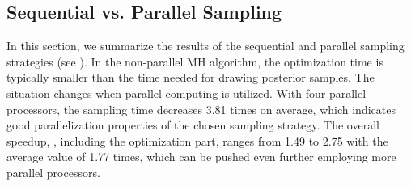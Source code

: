\subsection{Sequential vs. Parallel Sampling}
In this section, we summarize the results of the sequential and parallel  sampling strategies (see ).
In the non-parallel MH algorithm, the optimization time is typically smaller than the time needed for drawing posterior samples.
The situation changes when parallel computing is utilized. With four parallel processors, the sampling time decreases 3.81 times on average, which indicates good parallelization properties of the chosen sampling strategy.
The overall speedup, \ie, including the optimization part, ranges from 1.49 to 2.75 with the average value of 1.77 times, which can be pushed even further employing more parallel processors.
